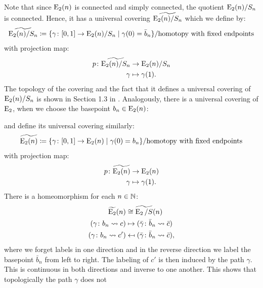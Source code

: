 \begin{const}
Note that since $\operatorname{E}_2(n)$ is connected and simply connected, the quotient $\operatorname{E}_2
(n) \slash S_n$ is connected. Hence, it has a universal covering
$\widetilde{\operatorname{E}_2(n) \slash S_n}$ which we define by:
\[
    \widetilde{\operatorname{E}_2(n) \slash S_n} \coloneq \{ \gamma \colon [0,1] \to \operatorname{E}_2(n) \slash S_n \mid \gamma(0) = \bar{b}_n \} 
    \slash \text{homotopy with fixed endpoints}
\]
with projection map:
\begin{align*}
    p \colon \widetilde{\operatorname{E}_2(n) \slash S_n} &\to \operatorname{E}_2(n) \slash S_n \\
    \gamma &\mapsto \gamma(1).
\end{align*}
The topology of the covering and the fact that it defines a universal covering
of $\operatorname{E}_2(n) \slash S_n$ is shown in Section 1.3 in \cite{Hatcher}. Analogously,
there is a universal covering of $\operatorname{E}_2$, when we choose the
basepoint $b_n \in \operatorname{E}_2(n)$:
\begin{center}
\end{center}
and define its universal covering similarly:
\[
    \widetilde{\operatorname{E}_2(n)} \coloneq \{ \gamma \colon [0,1] \to \operatorname{E}_2(n) \mid \gamma(0) = b_n \} 
    \slash \text{homotopy with fixed endpoints}
\]
with projection map:
\begin{align*}
    p \colon \widetilde{\operatorname{E}_2(n)} &\to \operatorname{E}_2(n) \\
    \gamma &\mapsto \gamma(1).
\end{align*}
There is a homeomorphism for each $n \in \mathbb{N}$:
\begin{align*}
    \widetilde{\operatorname{E}_2}(n) &\cong \widetilde{\operatorname{E}_2 \slash S}(n) \\
    (\gamma \colon b_n \rightsquigarrow c) &\mapsto (\bar{\gamma} \colon \bar{b}_n \rightsquigarrow \bar{c}) \\
    (\gamma \colon b_n \rightsquigarrow c') &\mapsfrom (\bar{\gamma} \colon \bar{b}_n \rightsquigarrow \bar{c}),
\end{align*}
where we forget labels in one direction and in the reverse direction we label
the basepoint $\bar{b}_n$ from left to right. The labeling of $c'$ is then
induced by the path $\gamma$. This is continuous in both directions and
inverse to one another. This shows that topologically the path $\gamma$ does not

\end{const}
